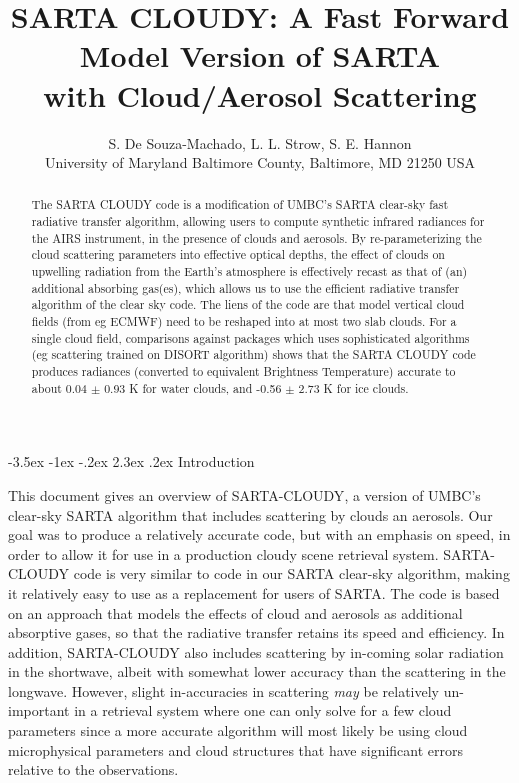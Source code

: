 \documentclass[11pt]{article}
\title{\textsf{SARTA CLOUDY}: A Fast Forward Model Version of
  \textsf{SARTA}\\ with Cloud/Aerosol Scattering}
\author{S. De Souza-Machado, L. L. Strow, S. E. Hannon \\
      University of Maryland Baltimore County, Baltimore, MD 21250 USA}
\makeatletter
\newcommand{\sa}{\textsf{SARTA}\xspace}
\newcommand{\sasc}{\textsf{SARTA-CLOUDY}\xspace}
\newcommand{\disort}{\textsf{DISORT}\xspace}
\newcommand{\ecmwf}{\textsf{ECMWF}\xspace}
\renewcommand{\section}{\@startsection {section}{1}{\z@}%
                                   {-3.5ex \@plus -1ex \@minus -.2ex}%
                                   {2.3ex \@plus.2ex}%
                                   {\reset@font\large\bfseries}}
\makeatother
\begin{document}
\maketitle

\begin{abstract}

      The \textsf{SARTA CLOUDY} code is a modification of UMBC's \sa
      clear-sky fast radiative transfer algorithm, allowing users to
      compute synthetic infrared radiances for the AIRS instrument, in
      the presence of clouds and aerosols. By re-parameterizing the
      cloud scattering parameters into effective optical depths, the
      effect of clouds on upwelling radiation from the Earth's
      atmosphere is effectively recast as that of (an) additional
      absorbing gas(es), which allows us to use the efficient
      radiative transfer algorithm of the clear sky code. The liens of
      the code are that model vertical cloud fields (from eg \ecmwf)
      need to be reshaped into at most two slab clouds. For a single cloud
      field, comparisons against packages which uses sophisticated algorithms
      (eg scattering trained on \disort algorithm) shows that the 
      \textsf{SARTA CLOUDY} code produces radiances (converted to equivalent 
      Brightness Temperature) accurate to about 0.04 $\pm$ 0.93 K for water clouds,  and 
      -0.56 $\pm$ 2.73 K for ice clouds.

\end{abstract}

\section{Introduction}

    This document gives an overview of \sasc, a version of UMBC's
    clear-sky \sa algorithm that includes scattering by clouds an
    aerosols.  Our goal was to produce a relatively accurate code, but
    with an emphasis on speed, in order to allow it for use in a
    production cloudy scene retrieval system.  \sasc code is very
    similar to code in our \sa clear-sky algorithm, making it
    relatively easy to use as a replacement for users of \sa.  The
    code is based on an approach that models the effects of cloud and
    aerosols as additional absorptive gases, so that the radiative
    transfer retains its speed and efficiency.  In addition, \sasc
    also includes scattering by in-coming solar radiation in the
    shortwave, albeit with somewhat lower accuracy than the scattering
    in the longwave.  However, slight in-accuracies in scattering
    \emph{may} be relatively un-important in a retrieval system where
    one can only solve for a few cloud parameters since a more
    accurate algorithm will most likely be using cloud microphysical
    parameters and cloud structures that have significant errors
    relative to the observations.
\end{document}
